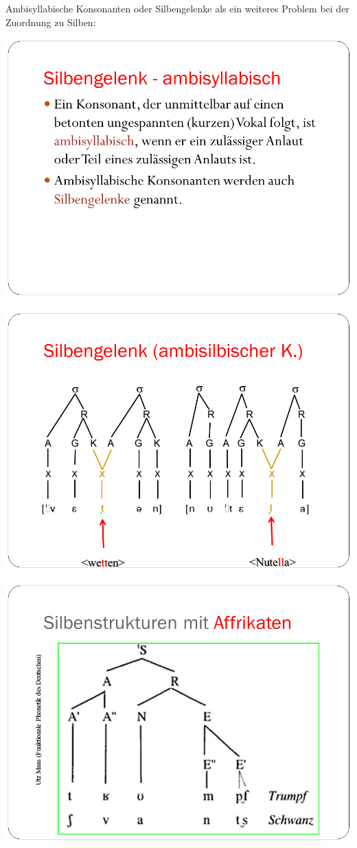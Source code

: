 \documentclass[
  letterpaper,
]{scrbook}
\begin{document}
Ambisyllabische Konsonanten oder Silbengelenke als ein weiteres Problem
bei der Zuordnung zu Silben:

\includegraphics[width=1\textwidth,height=\textheight]{./pictures/Wagner_Maas_Duden_Petric_39.PNG}

\includegraphics[width=1\textwidth,height=\textheight]{./pictures/Wagner_Maas_Duden_Petric_40.PNG}

\includegraphics[width=1\textwidth,height=\textheight]{./pictures/Wagner_Maas_Duden_Petric_41.PNG}
\end{document}
